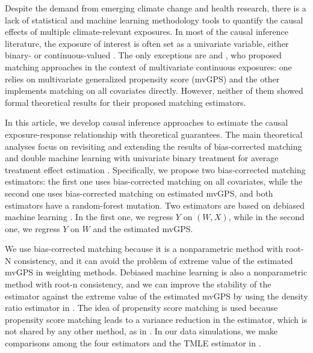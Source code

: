 \documentclass[11pt]{article}
\numberwithin{equation}{section}
\theoremstyle{definition}
\begin{document}

Despite the demand from emerging climate change and health research, there is a lack of statistical and machine learning methodology tools to quantify the causal effects of multiple climate-relevant exposures. In most of the causal inference literature, the exposure of interest is often set as a univariate variable, either binary- or continuous-valued \citep{rosenbaum1983central,hirano2004propensity}. The only exceptions are \cite{williams2020causal} and \cite{nethery2021evaluation}, who proposed matching approaches in the context of multivariate continuous exposures: one relies on multivariate generalized propensity score (mvGPS) and the other implements matching on all covariates directly. However, neither of them showed formal theoretical results for their proposed matching estimators. 

In this article, we develop causal inference approaches to estimate the causal exposure-response relationship with theoretical guarantees. The main theoretical analyses focus on revisiting and extending the results of bias-corrected matching and double machine learning with univariate binary treatment for average treatment effect estimation \citep{abadie2011bias, chernozhukov2018double}. 
Specifically, we propose two bias-corrected matching estimators: the first one uses bias-corrected matching on all covariates, while the second one uses bias-corrected matching on estimated mvGPS, and both estimators have a random-forest mutation. Two estimators are based on debiased machine learning \citep{chernozhukov2018double}. In the first one, we regress $Y$ on $(W,X)$, while in the second one, we regress $Y$ on $W$ and the estimated mvGPS. 

We use bias-corrected matching because it is a nonparametric method with root-N consistency, and it can avoid the problem of extreme value of the estimated mvGPS in weighting methods. Debiased machine learning is also a nonparametric method with root-n consistency, and we can improve the stability of the estimator against the extreme value of the estimated mvGPS by using the density ratio estimator in \cite{lin2023estimation}. The idea of propensity score matching is used because propensity score matching leads to a variance reduction in the estimator, which is not shared by any other method, as in \cite{abadie2016matching}. In our data simulations, we make comparisons among the four estimators and the TMLE estimator in \cite{mccoy2023semi}. 
\end{document}
